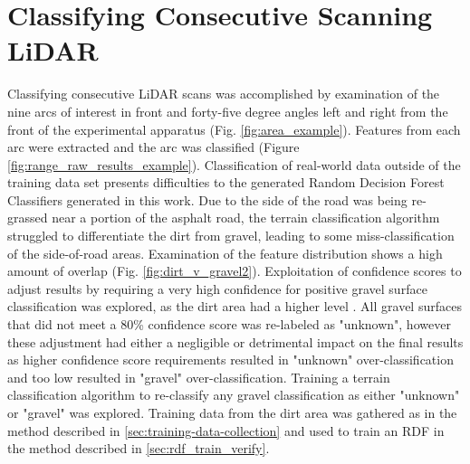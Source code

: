 \documentclass[numbered,pdftex]{ohio-etd}
\begin{document}
{{{	} %
		
	\section{Classifying Consecutive Scanning LiDAR}\label{sec:classify_consec_scan_lidar}{
	
		{Classifying consecutive LiDAR scans was accomplished by examination of the nine arcs of interest in front and forty-five degree angles left and right from the front of the experimental apparatus (Fig. \ref{fig:area_example}). Features from each arc were extracted and the arc was classified (Figure \ref{fig:range_raw_results_example}). Classification of real-world data outside of the training data set presents difficulties to the generated Random Decision Forest Classifiers generated in this work. Due to the side of the road was being re-grassed near a portion of the asphalt road, the terrain classification algorithm struggled to differentiate the dirt from gravel, leading to some miss-classification of the side-of-road areas. Examination of the feature distribution shows a high amount of overlap (Fig. \ref{fig:dirt_v_gravel2}). Exploitation of confidence scores to adjust results by requiring a very high confidence for positive gravel surface classification was explored, as the dirt area had a higher level . All gravel surfaces that did not meet a 80\% confidence score was re-labeled as "unknown", however these adjustment had either a negligible or detrimental impact on the final results as higher confidence score requirements resulted in "unknown" over-classification and too low resulted in "gravel" over-classification. Training a terrain classification algorithm to re-classify any gravel classification as either "unknown" or "gravel" was explored. Training data from the dirt area was gathered as in the method described in \ref{sec:training-data-collection} and used to train an RDF in the method described in \ref{sec:rdf_train_verify}. }
		
}}}
\end{document}
